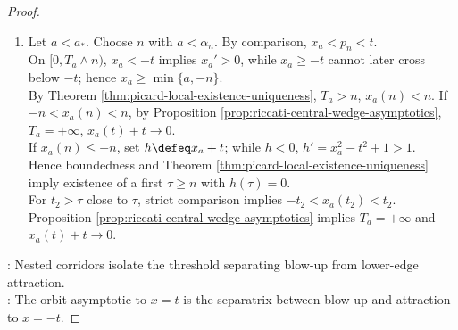\begin{theorem}
\begin{proof}
\begin{enumerate}[label=(\roman*)]
If $T_a\leq n$, $\ell_a\defeq\lim\limits_{t\uparrow T_a}x_a(t)\in(a,+\infty]$; $\ell_a<+\infty$ contradicts maximality (Theorem \ref{thm:picard-local-existence-uniqueness}), $x_a(t)\to+\infty$.\\
If $T_a>n$, then $x_a(n)>q_n(n)=\sqrt{n^2+2}$; Proposition \ref{prop:riccati-upper-isocline-blowup} implies $T_a<+\infty$ and $x_a(t)\to+\infty$ as $t\uparrow T_a$.
\item Let $a<a_*$. Choose $n$ with $a<\alpha_n$. By comparison, $x_a<p_n<t$.\\
On $[0,T_a\wedge n)$, $x_a<-t$ implies $x_a'>0$, while $x_a\geq-t$ cannot later cross below $-t$; hence $x_a\geq\min\{a,-n\}$.\\
By Theorem \ref{thm:picard-local-existence-uniqueness}, $T_a>n$, $x_a(n)<n$. If $-n<x_a(n)<n$, by Proposition \ref{prop:riccati-central-wedge-asymptotics}, $T_a=+\infty$, $x_a(t)+t\to0$.\\
If $x_a(n)\leq-n$, set $h\defeq x_a+t$; while $h<0$, $h'=x_a^2-t^2+1>1$.\\
Hence boundedness and Theorem \ref{thm:picard-local-existence-uniqueness} imply existence of a first $\tau\geq n$ with $h(\tau)=0$.\\
For $t_2>\tau$ close to $\tau$, strict comparison implies $-t_2<x_a(t_2)<t_2$.\\
Proposition \ref{prop:riccati-central-wedge-asymptotics} implies $T_a=+\infty$ and $x_a(t)+t\to0$.
\end{enumerate}
: Nested corridors isolate the threshold separating blow-up from lower-edge attraction.\\
: The orbit asymptotic to $x=t$ is the separatrix between blow-up and attraction to $x=-t$.
\end{proof}
\end{theorem}
